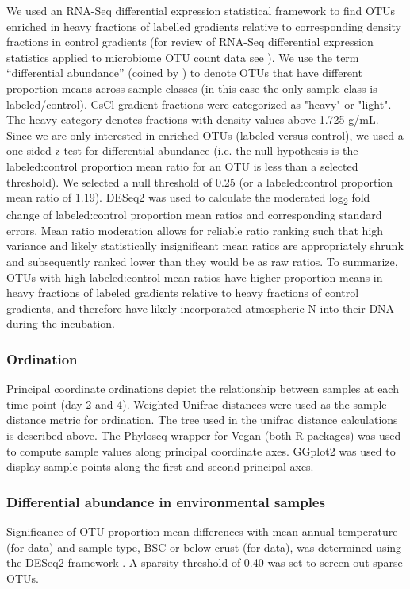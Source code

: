We used an RNA-Seq differential expression statistical framework
\cite{Love_2014} to find OTUs enriched in heavy fractions of labelled gradients
relative to corresponding density fractions in control gradients (for review of
RNA-Seq differential expression statistics applied to microbiome OTU count data
see \citet{24699258}). We use the term “differential abundance” (coined
by \citet{24699258}) to denote OTUs that have different proportion means
across sample classes (in this case the only sample class is labeled/control).
CsCl gradient fractions were categorized as "heavy" or "light". The heavy
category denotes fractions with density values above 1.725 g/mL. Since we are
only interested in enriched OTUs (labeled versus control), we used a one-sided
z-test for differential abundance (i.e. the null hypothesis is the
labeled:control proportion mean ratio for an OTU is less than a selected
threshold). We selected a null threshold of 0.25 (or a labeled:control
proportion mean ratio of 1.19). DESeq2 was used to calculate the moderated
log\textsubscript{2} fold change of labeled:control proportion mean ratios and
corresponding standard errors. Mean ratio moderation allows for reliable ratio
ranking such that high variance and likely statistically insignificant mean
ratios are appropriately shrunk and subsequently ranked lower than they would
be as raw ratios. To summarize, OTUs with high labeled:control mean ratios have
higher proportion means in heavy fractions of labeled gradients relative to
heavy fractions of control gradients, and therefore have likely incorporated
atmospheric N into their DNA during the incubation.

\subsubsection{Ordination}
Principal coordinate ordinations depict the relationship between samples at each time point (day 2 and 4). Weighted Unifrac distances \cite{16332807} were used as the sample distance metric for ordination. The tree used in the unifrac distance calculations is described above. The Phyloseq \cite{24699258} wrapper for Vegan \cite{vegan} (both R packages) was used to compute sample values along principal coordinate axes. GGplot2 \cite{ggplot2} was used to display sample points along the first and second principal axes.  

\subsubsection{Differential abundance in environmental samples}
Significance of OTU proportion mean differences with mean annual temperature
(for \citet{Garcia_Pichel_2013} data) and sample type, BSC or below crust (for
\citet{Steven_2013} data), was determined using the DESeq2 framework
\cite{24699258, Love_2014}. A sparsity threshold of 0.40 was set to screen out
sparse OTUs.  

